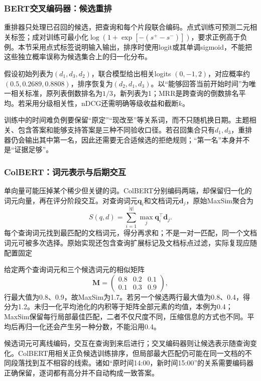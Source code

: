 \subsubsection{BERT交叉编码器：候选重排}
\label{sec:nlp-classification-rerank}

重排器只处理已召回的候选，把查询和每个片段联合编码。点式训练可预测二元相关标签；成对训练可最小化$\log(1+\exp[-(s^+-s^-)])$，要求正例高于负例。本节采用点式标签说明输入输出，排序时使用logit或其单调sigmoid，不能把这些独立概率误称为候选集合上的归一化分布。

假设初始列表为$(d_1,d_3,d_2)$，联合模型给出相关logits $(0,-1,2)$，对应概率约$(0.5,0.2689,0.8808)$，排序恢复为$(d_2,d_1,d_3)$。以“能够回答当前开始时间”为唯一相关标准，原列表倒数排名为$1/3$，新列表为1；MRR是跨查询的倒数排名平均。若采用分级相关性，nDCG还需明确等级收益和截断$k$。

训练中的时间难负例要保留“原定”“现改至”等关系词，而不只随机换日期。主题相关、包含答案和能够支持答案是三种不同验收口径。若召回集合只有$d_1,d_3$，重排器仍会输出其中第一名，因此还需要无合适候选的拒绝规则；“第一名”本身并不是“证据足够”。

\subsubsection{ColBERT：词元表示与后期交互}
\label{sec:nlp-classification-colbert}

单向量可能压掉某个稀少但关键的词。ColBERT分别编码两端，却保留归一化的词元向量，再在评分阶段交互。对查询词元$\bm q_i$和文档词元$\bm d_j$，原始MaxSim聚合为
\[
  S(q,d)=\sum_{i=1}^{|q|}\max_j \bm q_i^\top\bm d_j.
\]
每个查询词元找到最匹配的文档词元，得分再求和；不是一对一匹配，同一个文档词元可被多次选择。原始实现还包含查询扩展标记及文档标点过滤，实际复现应随配置固定

给定两个查询词元和三个候选词元的相似矩阵
\[
  \bm M=
  \begin{pmatrix}
    0.8&0.2&0.1\\
    0.1&0.3&0.9
  \end{pmatrix},
\]
行最大值为0.8、0.9，故MaxSim为1.7。若另一个候选两行最大值为0.8、0.4，得分为1.2。未归一化平均池化的内积等于矩阵全部元素的均值，本例为0.4；MaxSim保留每行局部最佳匹配，二者不仅尺度不同，压缩信息的方式也不同。平均后再归一化还会产生另一种分数，不能沿用0.4。

候选词元可离线编码，交互在查询到来后进行；交叉编码器则让候选表示随查询变化。ColBERT用相关正负候选训练排序，但局部最大匹配仍可能在同一文档的不同段落找到互不相容的线索。诸如“原时间14:00，新时间15:00”的关系需要编码器正确保留，逐词都有高分并不自动构成一致答案。

